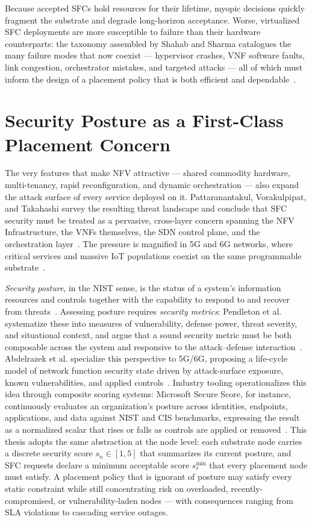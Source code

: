 Because accepted SFCs hold resources for their lifetime, myopic
decisions quickly fragment the substrate and degrade long-horizon
acceptance. Worse, virtualized SFC deployments are more susceptible to
failure than their hardware counterparts: the taxonomy assembled by
Shahab and Sharma catalogues the many failure modes that now coexist
--- hypervisor crashes, VNF software faults, link congestion, orchestrator
mistakes, and targeted attacks --- all of which must inform the design of a
placement policy that is both efficient and
dependable~\cite{shahab_fault_2025}.

\section{Security Posture as a First-Class Placement Concern}

The very features that make NFV attractive --- shared commodity
hardware, multi-tenancy, rapid reconfiguration, and dynamic orchestration
--- also expand the attack surface of every service deployed on it.
Pattaranantakul, Vorakulpipat, and Takahashi survey the resulting
threat landscape and conclude that SFC security must be treated as a
pervasive, cross-layer concern spanning the NFV Infrastructure, the VNFs
themselves, the SDN control plane, and the orchestration
layer~\cite{pattaranantakul_service_2023}. The pressure is magnified in
5G and 6G networks, where critical services and massive
IoT populations coexist on the same programmable
substrate~\cite{abdelrazek_measuring_2025, you_towards_2021}.

\textit{Security posture}, in the NIST sense, is the status of a
system's information resources and controls together with the
capability to respond to and recover from
threats~\cite{editor_security_nodate}. Assessing posture requires
\textit{security metrics}: Pendleton et al. systematize these into
measures of vulnerability, defense power, threat severity, and
situational context, and argue that a sound security metric must be
both composable across the system and responsive to the attack--defense
interaction~\cite{pendleton_survey_2017}. Abdelrazek et al. specialize
this perspective to 5G/6G, proposing a life-cycle model of network
function security state driven by attack-surface exposure, known
vulnerabilities, and applied controls~\cite{abdelrazek_measuring_2025}.
Industry tooling operationalizes this idea through composite scoring
systems: Microsoft Secure Score, for instance, continuously evaluates
an organization's posture across identities, endpoints, applications,
and data against NIST and CIS benchmarks, expressing the result as a
normalized scalar that rises or falls as controls are applied or
removed~\cite{arvatosystems2025securescore}. This thesis adopts the
same abstraction at the node level: each substrate node carries a
discrete security score $s_n \in [1, 5]$ that summarizes its current
posture, and SFC requests declare a minimum acceptable score
$s_r^{\min}$ that every placement node must satisfy.
A placement policy that is ignorant of posture may satisfy every
static constraint while still concentrating risk on overloaded,
recently-compromised, or vulnerability-laden nodes --- with
consequences ranging from SLA violations to cascading service outages.

